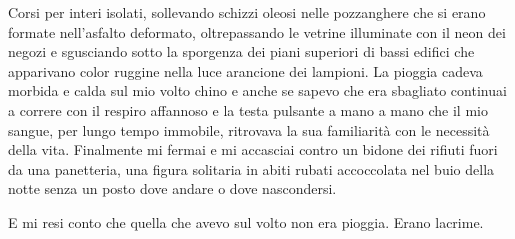 Corsi per interi isolati, sollevando schizzi oleosi nelle pozzanghere
che si erano formate nell'asfalto deformato, oltrepassando le vetrine
illuminate con il neon dei negozi e sgusciando sotto la sporgenza dei
piani superiori di bassi edifici che apparivano color ruggine nella luce
arancione dei lampioni. La pioggia cadeva morbida e calda sul mio volto
chino e anche se sapevo che era sbagliato continuai a correre con il
respiro affannoso e la testa pulsante a mano a mano che il mio sangue,
per lungo tempo immobile, ritrovava la sua familiarità con le necessità
della vita. Finalmente mi fermai e mi accasciai contro un bidone dei
rifiuti fuori da una panetteria, una figura solitaria in abiti rubati
accoccolata nel buio della notte senza un posto dove andare o dove
nascondersi.

E mi resi conto che quella che avevo sul volto non era pioggia. Erano
lacrime.


